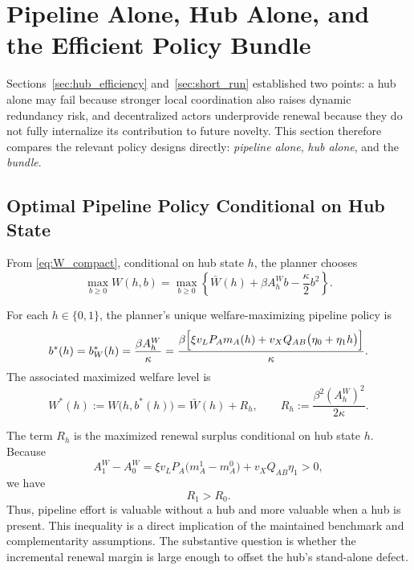 \section{Pipeline Alone, Hub Alone, and the Efficient Policy Bundle}
\label{sec:refresh}

Sections~\ref{sec:hub_efficiency} and~\ref{sec:short_run} established two points: a hub alone may fail because stronger local coordination also raises dynamic redundancy risk, and decentralized actors underprovide renewal because they do not fully internalize its contribution to future novelty. This section therefore compares the relevant policy designs directly: \emph{pipeline alone}, \emph{hub alone}, and the \emph{bundle}.

\subsection{Optimal Pipeline Policy Conditional on Hub State}

From \eqref{eq:W_compact}, conditional on hub state $h$, the planner chooses
\[
\max_{b\ge 0}W(h,b)
=
\max_{b\ge 0}
\left\{
\bar W(h)+\beta A_h^W b-\frac{\kappa}{2}b^2
\right\}.
\]

\begin{proposition}
\label{prop:optimal_refresh}
For each $h\in\{0,1\}$, the planner's unique welfare-maximizing pipeline policy is
\begin{equation}
b^*(h)=b_W^*(h)=\frac{\beta A_h^W}{\kappa}
=
\frac{\beta\Bigl[\xi v_L P_A m_A(h)+v_X Q_{AB}\bigl(\eta_0+\eta_1 h\bigr)\Bigr]}{\kappa}.
\label{eq:bstar}
\end{equation}
The associated maximized welfare level is
\begin{equation}
W^*(h)
:=
W\bigl(h,b^*(h)\bigr)
=
\bar W(h)+R_h,
\qquad
R_h:=\frac{\beta^2(A_h^W)^2}{2\kappa}.
\label{eq:Wstar_h}
\end{equation}
\end{proposition}

The term $R_h$ is the maximized renewal surplus conditional on hub state $h$. Because
\[
A_1^W-A_0^W
=
\xi v_L P_A\bigl(m_A^1-m_A^0\bigr)+v_X Q_{AB}\eta_1
>0,
\]
we have
\begin{equation}
R_1>R_0.
\label{eq:R1gtR0}
\end{equation}
Thus, pipeline effort is valuable without a hub and more valuable when a hub is present. This inequality is a direct implication of the maintained benchmark and complementarity assumptions. The substantive question is whether the incremental renewal margin is large enough to offset the hub's stand-alone defect.

